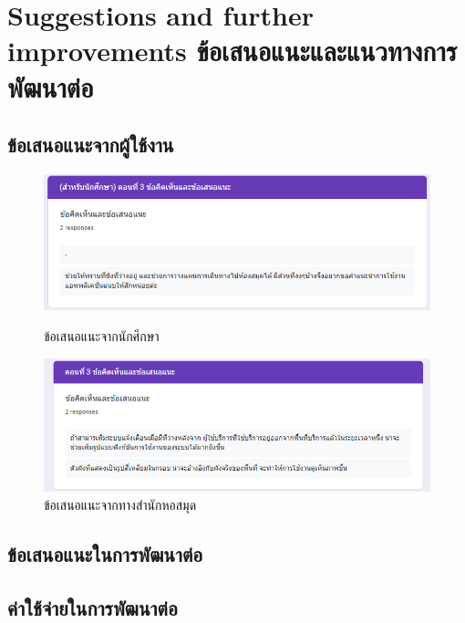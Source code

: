 \newpage
\section{\ifenglish%
Suggestions and further improvements
\else%
ข้อเสนอแนะและแนวทางการพัฒนาต่อ
\fi
}
\subsection{ข้อเสนอแนะจากผู้ใช้งาน}
\begin{figure}[ht]
    \centering
    \includegraphics[scale=0.8]{images/student-s.png}
    \caption[st-s]{ข้อเสนอแนะจากนักศึกษา}
    \label{fig:st-s}
    \centering
    \includegraphics[scale=0.8]{images/cmul-s.png}
    \caption[cmul-s]{ข้อเสนอแนะจากทางสำนักหอสมุด}
    \label{fig:cmul-s}
\end{figure}

\subsection{ข้อเสนอแนะในการพัฒนาต่อ}
\subsection{ค่าใช้จ่ายในการพัฒนาต่อ}
